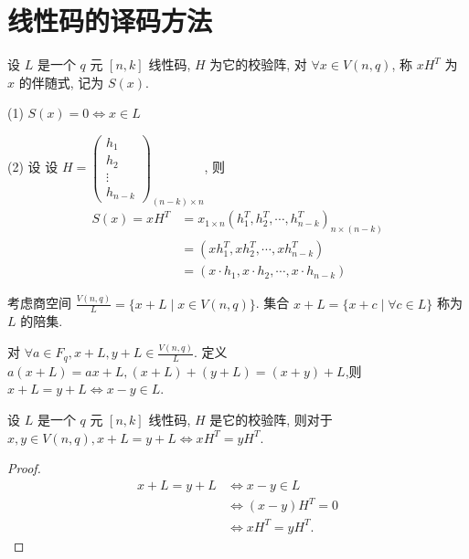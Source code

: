 \section{线性码的译码方法}
\begin{definition}[伴随式]
    设 $ L $ 是一个 $ q $ 元 $ [n, k] $ 线性码, $ H $ 为它的校验阵, 对 $ \forall x \in V(n, q) $, 称 $ x H^{T} $ 为 $ x $ 的伴随式, 记为 $ S(x) $.
\end{definition}
\begin{remark}

     (1) $ S(x)=0 \Leftrightarrow x \in L $

     (2) 设
设 $ H=\left(\begin{array}{c}h_{1} \\ h_{2} \\ \vdots \\ h_{n-k}\end{array}\right)_{(n-k) \times n} $,
则
$$
\begin{aligned}
S(x)=x H^{T} & =x_{1 \times n}\left(h_{1}^{T}, h_{2}^{T}, \cdots, h_{n-k}^{T}\right)_{n \times(n-k)} \\
& =\left(x h_{1}^{T}, x h_{2}^{T}, \cdots, x h_{n-k}^{T}\right) \\
& =\left(x \cdot h_{1}, x \cdot h_{2}, \cdots, x \cdot h_{n-k}\right)
\end{aligned}
$$
\end{remark}
考虑商空间 $ \frac{V(n, q)}{L}=\{x+L \mid x \in V(n, q)\} $. 集合
$ x+L=\{x+c \mid \forall c \in L\} $ 称为 $ L $ 的陪集.

对 $ \forall a \in F_{q}, x+L, y+L \in \frac{V(n, q)}{L} $.
定义 $ a(x+L)=a x+L,(x+L)+(y+L)=(x+y)+L $,则 $ x+L=y+L \Leftrightarrow x-y \in L $.

\begin{theorem}
    设 $ L $ 是一个 $ q $ 元 $ [n, k] $ 线性码, $ H $ 是它的校验阵, 则对于 $ x, y \in V(n, q), x+L=y+L \Leftrightarrow x H^{T}=y H^{T} $.
\end{theorem}
\begin{proof}
$$
\begin{aligned}
 x+L=y+L &\Leftrightarrow x-y \in L \\
&\Leftrightarrow(x-y) H^{T}=0 \\
&\Leftrightarrow x H^{T}=y H^{T} .
\end{aligned}
$$
\end{proof}

